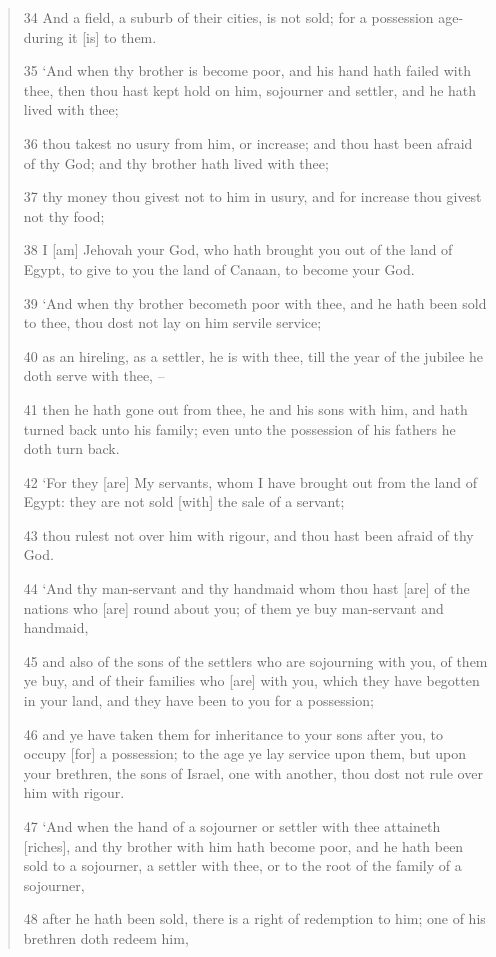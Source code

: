 \documentclass[11pt]{article}
\begin{document}
\begin{quote}
34 And a field, a suburb of their cities, is not sold; for a possession age-during it [is] to them.

35 `And when thy brother is become poor, and his hand hath failed with thee, then thou hast kept hold on him, sojourner and settler, and he hath lived with thee;

36 thou takest no usury from him, or increase; and thou hast been afraid of thy God; and thy brother hath lived with thee;

37 thy money thou givest not to him in usury, and for increase thou givest not thy food;

38 I [am] Jehovah your God, who hath brought you out of the land of Egypt, to give to you the land of Canaan, to become your God.

39 `And when thy brother becometh poor with thee, and he hath been sold to thee, thou dost not lay on him servile service;

40 as an hireling, as a settler, he is with thee, till the year of the jubilee he doth serve with thee, --

41 then he hath gone out from thee, he and his sons with him, and hath turned back unto his family; even unto the possession of his fathers he doth turn back.

42 `For they [are] My servants, whom I have brought out from the land of Egypt: they are not sold [with] the sale of a servant;

43 thou rulest not over him with rigour, and thou hast been afraid of thy God.

44 `And thy man-servant and thy handmaid whom thou hast [are] of the nations who [are] round about you; of them ye buy man-servant and handmaid,

45 and also of the sons of the settlers who are sojourning with you, of them ye buy, and of their families who [are] with you, which they have begotten in your land, and they have been to you for a possession;

46 and ye have taken them for inheritance to your sons after you, to occupy [for] a possession; to the age ye lay service upon them, but upon your brethren, the sons of Israel, one with another, thou dost not rule over him with rigour.

47 `And when the hand of a sojourner or settler with thee attaineth [riches], and thy brother with him hath become poor, and he hath been sold to a sojourner, a settler with thee, or to the root of the family of a sojourner,

48 after he hath been sold, there is a right of redemption to him; one of his brethren doth redeem him,


\end{quote}
\end{document}
